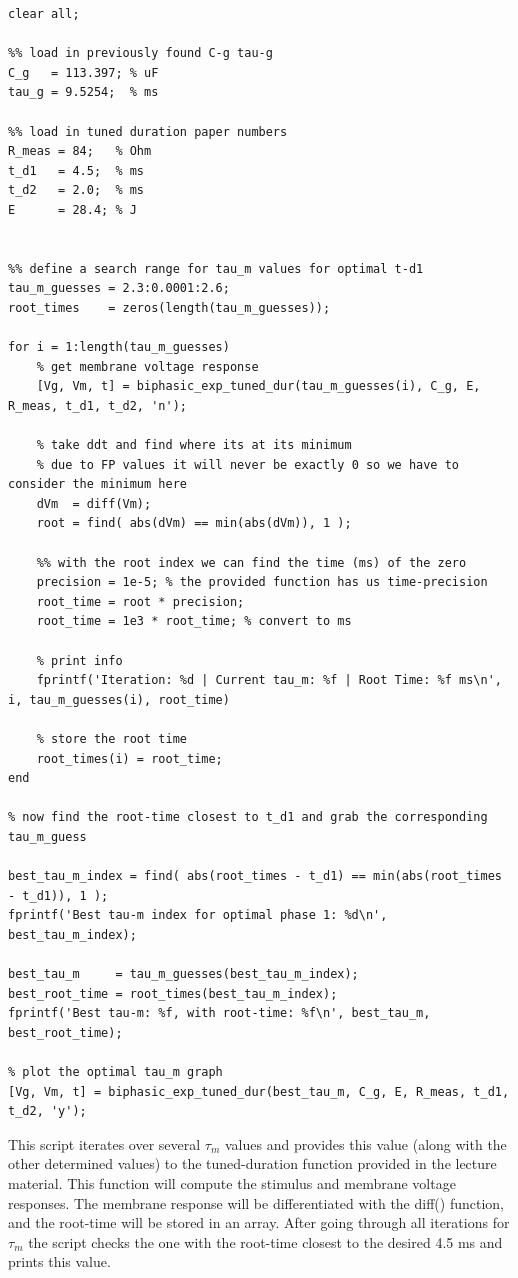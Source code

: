 \documentclass[]{report}
\begin{document}
\begin{lstlisting}[style=Matlab-editor, backgroundcolor=\color{smoky}, basicstyle=\ttfamily\tiny]
clear all;

%% load in previously found C-g tau-g
C_g   = 113.397; % uF
tau_g = 9.5254;  % ms

%% load in tuned duration paper numbers
R_meas = 84;   % Ohm
t_d1   = 4.5;  % ms
t_d2   = 2.0;  % ms
E      = 28.4; % J


%% define a search range for tau_m values for optimal t-d1
tau_m_guesses = 2.3:0.0001:2.6;
root_times    = zeros(length(tau_m_guesses));

for i = 1:length(tau_m_guesses)
	% get membrane voltage response
	[Vg, Vm, t] = biphasic_exp_tuned_dur(tau_m_guesses(i), C_g, E, R_meas, t_d1, t_d2, 'n');
	
	% take ddt and find where its at its minimum
	% due to FP values it will never be exactly 0 so we have to consider the minimum here
	dVm  = diff(Vm);
	root = find( abs(dVm) == min(abs(dVm)), 1 );
	
	%% with the root index we can find the time (ms) of the zero
	precision = 1e-5; % the provided function has us time-precision
	root_time = root * precision;
	root_time = 1e3 * root_time; % convert to ms
	
	% print info
	fprintf('Iteration: %d | Current tau_m: %f | Root Time: %f ms\n', i, tau_m_guesses(i), root_time)
	
	% store the root time
	root_times(i) = root_time;
end

% now find the root-time closest to t_d1 and grab the corresponding tau_m_guess

best_tau_m_index = find( abs(root_times - t_d1) == min(abs(root_times - t_d1)), 1 );
fprintf('Best tau-m index for optimal phase 1: %d\n', best_tau_m_index);

best_tau_m     = tau_m_guesses(best_tau_m_index);
best_root_time = root_times(best_tau_m_index);
fprintf('Best tau-m: %f, with root-time: %f\n', best_tau_m, best_root_time);

% plot the optimal tau_m graph 
[Vg, Vm, t] = biphasic_exp_tuned_dur(best_tau_m, C_g, E, R_meas, t_d1, t_d2, 'y');
\end{lstlisting}

This script iterates over several $\tau_m$ values and provides this value (along with the other determined values) to the tuned-duration function provided in the lecture material. This function will compute the stimulus and membrane voltage responses. The membrane response will be differentiated with the diff() function, and the root-time will be stored in an array. After going through all iterations for $\tau_m$ the script checks the one with the root-time closest to the desired 4.5 ms and prints this value.
\end{document}

